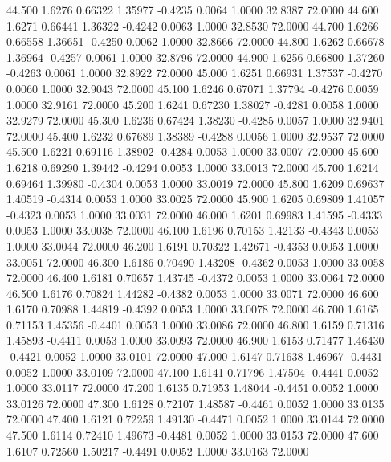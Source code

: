   44.500   1.6276   0.66322   1.35977  -0.4235   0.0064   1.0000  32.8387  72.0000
  44.600   1.6271   0.66441   1.36322  -0.4242   0.0063   1.0000  32.8530  72.0000
  44.700   1.6266   0.66558   1.36651  -0.4250   0.0062   1.0000  32.8666  72.0000
  44.800   1.6262   0.66678   1.36964  -0.4257   0.0061   1.0000  32.8796  72.0000
  44.900   1.6256   0.66800   1.37260  -0.4263   0.0061   1.0000  32.8922  72.0000
  45.000   1.6251   0.66931   1.37537  -0.4270   0.0060   1.0000  32.9043  72.0000
  45.100   1.6246   0.67071   1.37794  -0.4276   0.0059   1.0000  32.9161  72.0000
  45.200   1.6241   0.67230   1.38027  -0.4281   0.0058   1.0000  32.9279  72.0000
  45.300   1.6236   0.67424   1.38230  -0.4285   0.0057   1.0000  32.9401  72.0000
  45.400   1.6232   0.67689   1.38389  -0.4288   0.0056   1.0000  32.9537  72.0000
  45.500   1.6221   0.69116   1.38902  -0.4284   0.0053   1.0000  33.0007  72.0000
  45.600   1.6218   0.69290   1.39442  -0.4294   0.0053   1.0000  33.0013  72.0000
  45.700   1.6214   0.69464   1.39980  -0.4304   0.0053   1.0000  33.0019  72.0000
  45.800   1.6209   0.69637   1.40519  -0.4314   0.0053   1.0000  33.0025  72.0000
  45.900   1.6205   0.69809   1.41057  -0.4323   0.0053   1.0000  33.0031  72.0000
  46.000   1.6201   0.69983   1.41595  -0.4333   0.0053   1.0000  33.0038  72.0000
  46.100   1.6196   0.70153   1.42133  -0.4343   0.0053   1.0000  33.0044  72.0000
  46.200   1.6191   0.70322   1.42671  -0.4353   0.0053   1.0000  33.0051  72.0000
  46.300   1.6186   0.70490   1.43208  -0.4362   0.0053   1.0000  33.0058  72.0000
  46.400   1.6181   0.70657   1.43745  -0.4372   0.0053   1.0000  33.0064  72.0000
  46.500   1.6176   0.70824   1.44282  -0.4382   0.0053   1.0000  33.0071  72.0000
  46.600   1.6170   0.70988   1.44819  -0.4392   0.0053   1.0000  33.0078  72.0000
  46.700   1.6165   0.71153   1.45356  -0.4401   0.0053   1.0000  33.0086  72.0000
  46.800   1.6159   0.71316   1.45893  -0.4411   0.0053   1.0000  33.0093  72.0000
  46.900   1.6153   0.71477   1.46430  -0.4421   0.0052   1.0000  33.0101  72.0000
  47.000   1.6147   0.71638   1.46967  -0.4431   0.0052   1.0000  33.0109  72.0000
  47.100   1.6141   0.71796   1.47504  -0.4441   0.0052   1.0000  33.0117  72.0000
  47.200   1.6135   0.71953   1.48044  -0.4451   0.0052   1.0000  33.0126  72.0000
  47.300   1.6128   0.72107   1.48587  -0.4461   0.0052   1.0000  33.0135  72.0000
  47.400   1.6121   0.72259   1.49130  -0.4471   0.0052   1.0000  33.0144  72.0000
  47.500   1.6114   0.72410   1.49673  -0.4481   0.0052   1.0000  33.0153  72.0000
  47.600   1.6107   0.72560   1.50217  -0.4491   0.0052   1.0000  33.0163  72.0000
